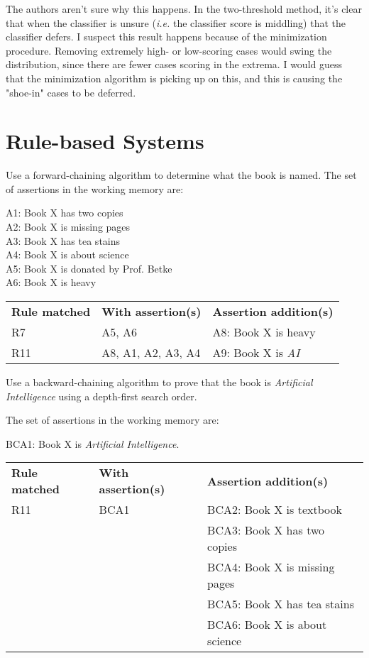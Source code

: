 \documentclass[11pt,largemargins, anonymous]{homework}
\begin{document}
\begin{arabicparts}
    \questionpart

    The authors aren't sure why this happens.
    In the two-threshold method, it's clear that when the classifier is unsure
    (\textit{i.e.} the classifier score is middling) that the classifier defers.
    I suspect this result happens because of the minimization procedure.
    Removing extremely high- or low-scoring cases would swing the distribution,
    since there are fewer cases scoring in the extrema.
    I would guess that the minimization algorithm is picking up on this,
    and this is causing the "shoe-in" cases to be deferred.

\end{arabicparts}

\part{Rule-based Systems}

\question

Use a forward-chaining algorithm to determine what the book is named.
The set of assertions in the working memory are:

    A1: Book X has two copies \\
    A2: Book X is missing pages \\
    A3: Book X has tea stains \\
    A4: Book X is about science \\
    A5: Book X is donated by Prof. Betke \\
    A6: Book X is heavy \\

\begin{tabular}{lll}
    \textbf{Rule matched} & \textbf{With assertion(s)} & \textbf{Assertion addition(s)} \\
    R7 & A5, A6 & A8: Book X is heavy \\
    R11 & A8, A1, A2, A3, A4 & A9: Book X is \textit{AI}
\end{tabular}

\question

Use a backward-chaining algorithm to prove that the book is \textit{Artificial Intelligence}
using a depth-first search order.

The set of assertions in the working memory are:

BCA1: Book X is \textit{Artificial Intelligence}.

\begin{tabular}{lll}
    \textbf{Rule matched} & \textbf{With assertion(s)} & \textbf{Assertion addition(s)} \\
    R11 & BCA1 & BCA2: Book X is textbook \\
    & & BCA3: Book X has two copies \\
    & & BCA4: Book X is missing pages \\
    & & BCA5: Book X has tea stains \\
    & & BCA6: Book X is about science \\
\end{tabular}
\end{document}
